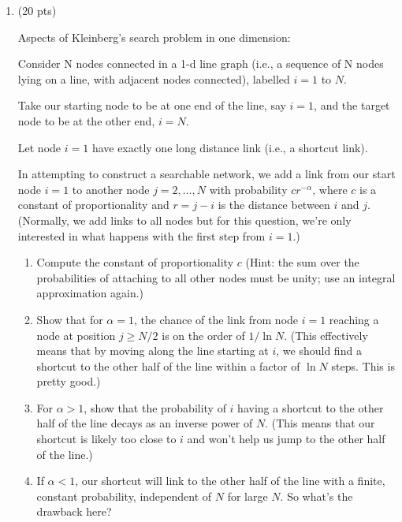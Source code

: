 \begin{enumerate}
  (b) Bonus question territory: Krapivsky and Redner also 
  looked at the specific attachment kernel
  $A_{1} = \alpha$ and $A_{k} = k$ for $k>1$, where $\alpha>0$.
  They determined that the resulting degree distribution has
  a power-law tale obeying $k^{-\gamma}$ where $\gamma = (3+\sqrt{1+8\alpha})/2$.
  
  Using this modified linear attachment kernel, show that 
  $\mu(\mu-1)=2\alpha$.



\item (20 pts)

  Aspects of Kleinberg's search problem in one dimension:

  Consider N nodes connected in a 1-d line graph (i.e., 
  a sequence of N nodes lying on a line, with adjacent nodes
  connected), labelled $i=1$ to $N$.

  Take our starting node to be at one end of the line, say $i=1$,
  and the target node to be at the other end, $i=N$.

  Let node $i=1$ have exactly one long distance link (i.e., a shortcut link).

  In attempting to construct a searchable network,
  we add a link from our start node $i=1$ to another node
  $j=2, \ldots, N$
  with probability $c r^{-\alpha}$, where $c$ is
  a constant of proportionality and $r=j-i$ is the distance
  between $i$ and $j$.  (Normally, we add links to all nodes but
  for this question, we're only interested in what happens
  with the first step from $i=1$.)

  \begin{enumerate}
  \item Compute the constant of proportionality $c$ 
    (Hint: the sum over the probabilities of attaching
    to all other nodes must be unity; use an integral approximation again.)
  \item Show that for $\alpha=1$, the chance of the link from node
    $i=1$ reaching a node at position $j \ge N/2$ is on the order
    of $1/\ln{N}$.  (This effectively means 
    that by moving along the line starting at $i$,
    we should find a shortcut
    to the other half of the line within a factor of $\ln{N}$ steps. 
    This is pretty good.)
  \item For $\alpha>1$, show that the probability of $i$ having
    a shortcut to the other half of the line decays as an inverse
    power of $N$.  (This means that our shortcut is
    likely too close to $i$ and won't help us jump to the other 
    half of the line.)
  \item If $\alpha<1$, our shortcut will link
    to the other half of the line with a finite, constant probability,
    independent of $N$ for large $N$.  So what's the drawback here?
  \end{enumerate}


\end{enumerate}
